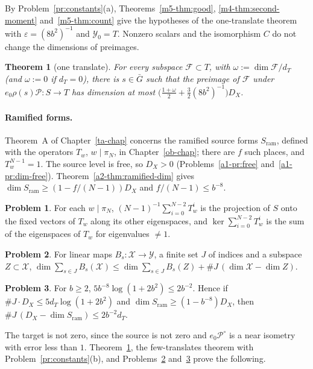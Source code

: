 \documentclass[reqno]{amsart}
\newcounter{chap}
\theoremstyle{definition}
\newtheorem{problem}{Problem}[section]
\theoremstyle{plain}
\newtheorem{theorem}{Theorem}[section]
\theoremstyle{remark}
\newcommand{\Xc}{\mathcal X}
\newcommand{\Yc}{\mathcal Y}
\newcommand{\Pc}{\mathcal P}
\newcommand{\Gb}{\bar G}
\newcommand{\Sr}{S_{\mathrm{ram}}}
\begin{document}
By Problem~\ref{pr:constants}(a), Theorems~\ref{m5-thm:good}, \ref{m4-thm:second-moment} and~\ref{m5-thm:count} give the hypotheses of the one-translate theorem with \(\varepsilon=(8b^2)^{-1}\) and \(\Yc_0=T\).  Nonzero scalars and the isomorphism \(C\) do not change the dimensions of preimages.

\begin{theorem}[one translate]\label{thm:spread}
For every subspace \(\mathcal F\subset T\), with \(\omega:=\dim\mathcal F/d_T\) (and \(\omega:=0\) if \(d_T=0\)), there is \(s\in\Gb\) such that the preimage of \(\mathcal F\) under \(e_0\rho(s)\Pc\colon S\to T\) has dimension at most \(\bigl(\frac{1+\omega}2+\frac32(8b^2)^{-1}\bigr)D_X\).
\end{theorem}

\paragraph{Ramified forms.}  Theorem~A of Chapter~\ref{ta-chap} concerns the ramified source forms \(\Sr\), defined with the operators \(T_w\), \(w\mid\pi_N\), in Chapter~\ref{ob-chap}; there are \(f\) such places, and \(T_w^{N-1}=1\).  The source level is free, so \(D_X>0\) (Problems~\ref{a1-pr:free} and~\ref{a1-pr:dim-free}).  Theorem~\ref{a2-thm:ramified-dim} gives \(\dim\Sr\ge(1-f/(N-1))D_X\) and \(f/(N-1)\le b^{-8}\).

\begin{problem}\label{pr:ramified}
For each \(w\mid\pi_N\), \((N-1)^{-1}\sum_{i=0}^{N-2}T_w^i\) is the projection of \(S\) onto the fixed vectors of \(T_w\) along its other eigenspaces, and \(\ker\sum_{i=0}^{N-2}T_w^i\) is the sum of the eigenspaces of \(T_w\) for eigenvalues \(\ne1\).
\end{problem}

\begin{problem}\label{pr:restrict}
For linear maps \(B_s\colon\Xc\to\Yc\), a finite set \(J\) of indices and a subspace \(Z\subset\Xc\),
\(\dim\sum_{s\in J}B_s(\Xc)\le\dim\sum_{s\in J}B_s(Z)+\#J\,(\dim\Xc-\dim Z)\).
\end{problem}

\begin{problem}\label{pr:loss}
For \(b\ge2\), \(5b^{-8}\log(1+2b^2)\le2b^{-2}\).  Hence if \(\#J\cdot D_X\le5d_T\log(1+2b^2)\) and \(\dim\Sr\ge(1-b^{-8})D_X\), then \(\#J\,(D_X-\dim\Sr)\le2b^{-2}d_T\).
\end{problem}

The target is not zero, since the source is not zero and \(e_0\Pc^\circ\) is a near isometry with error less than \(1\).  Theorem~\ref{thm:spread}, the few-translates theorem with Problem~\ref{pr:constants}(b), and Problems~\ref{pr:restrict} and~\ref{pr:loss} prove the following.
\end{document}
